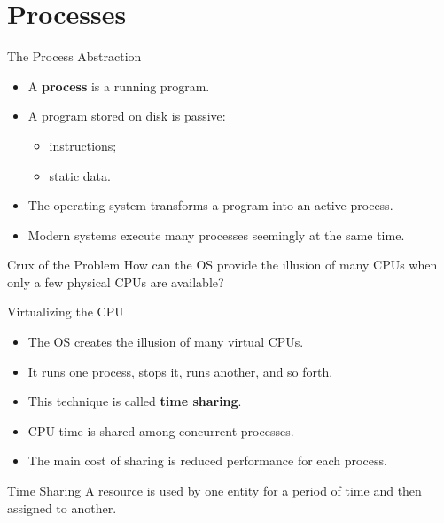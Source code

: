 \section{Processes}

\begin{frame}{The Process Abstraction}

\begin{itemize}
    \item A \textbf{process} is a running program.
    \item A program stored on disk is passive:
    \begin{itemize}
        \item instructions;
        \item static data.
    \end{itemize}
    \item The operating system transforms a program into an active process.
    \item Modern systems execute many processes seemingly at the same time.
\end{itemize}

\begin{alertblock}{Crux of the Problem}
How can the OS provide the illusion of many CPUs when only a few
physical CPUs are available?
\end{alertblock}

\end{frame}

\begin{frame}{Virtualizing the CPU}

\begin{itemize}
    \item The OS creates the illusion of many virtual CPUs.
    \item It runs one process, stops it, runs another, and so forth.
    \item This technique is called \textbf{time sharing}.
    \item CPU time is shared among concurrent processes.
    \item The main cost of sharing is reduced performance for each process.
\end{itemize}

\vspace{0.3cm}

\begin{block}{Time Sharing}
A resource is used by one entity for a period of time and then
assigned to another.
\end{block}

\end{frame}


